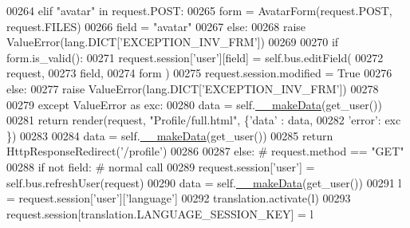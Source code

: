 \begin{DoxyCode}
00264                 \textcolor{keywordflow}{elif} \textcolor{stringliteral}{"avatar"} \textcolor{keywordflow}{in} request.POST:
00265                     form = AvatarForm(request.POST, request.FILES)
00266                     field = \textcolor{stringliteral}{"avatar"}
00267                 \textcolor{keywordflow}{else}:
00268                     \textcolor{keywordflow}{raise} ValueError(lang.DICT[\textcolor{stringliteral}{'EXCEPTION\_INV\_FRM'}])
00269 
00270                 \textcolor{keywordflow}{if} form.is\_valid():
00271                     request.session[\textcolor{stringliteral}{'user'}][field] = self.bus.editField(
00272                                                         request, 
00273                                                         field, 
00274                                                         form )
00275                     request.session.modified = \textcolor{keyword}{True}
00276                 \textcolor{keywordflow}{else}:
00277                     \textcolor{keywordflow}{raise} ValueError(lang.DICT[\textcolor{stringliteral}{'EXCEPTION\_INV\_FRM'}])
00278 
00279             \textcolor{keywordflow}{except} ValueError \textcolor{keyword}{as} exc:
00280                 data = self.\hyperlink{classProfile_1_1ProfileUnit_1_1UiFullProfile_ae0e9c54df37ab45f0d1c5d894181d10f}{\_\_makeData}(get\_user())
00281                 \textcolor{keywordflow}{return} render(request, \textcolor{stringliteral}{"Profile/full.html"}, \{\textcolor{stringliteral}{'data'} : data,
00282                                                              \textcolor{stringliteral}{'error'}: exc \})
00283 
00284             data = self.\hyperlink{classProfile_1_1ProfileUnit_1_1UiFullProfile_ae0e9c54df37ab45f0d1c5d894181d10f}{\_\_makeData}(get\_user())
00285             \textcolor{keywordflow}{return} HttpResponseRedirect(\textcolor{stringliteral}{'/profile'})
00286 
00287         \textcolor{keywordflow}{else}: \textcolor{comment}{# request.method == "GET"}
00288             \textcolor{keywordflow}{if} \textcolor{keywordflow}{not} field: \textcolor{comment}{# normal call}
00289                 request.session[\textcolor{stringliteral}{'user'}] = self.bus.refreshUser(request)
00290                 data = self.\hyperlink{classProfile_1_1ProfileUnit_1_1UiFullProfile_ae0e9c54df37ab45f0d1c5d894181d10f}{\_\_makeData}(get\_user())
00291                 l = request.session[\textcolor{stringliteral}{'user'}][\textcolor{stringliteral}{'language'}]
00292                 translation.activate(l)
00293                 request.session[translation.LANGUAGE\_SESSION\_KEY] = l

\end{DoxyCode}

